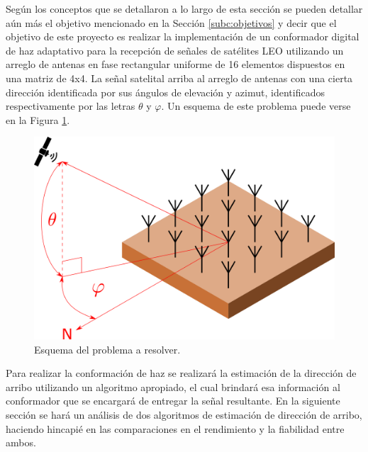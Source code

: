 Según los conceptos que se detallaron a lo largo de esta sección se pueden detallar aún más el objetivo mencionado en la Sección \ref{subc:objetivos} y decir que el objetivo de este proyecto es realizar la implementación de un conformador digital de haz adaptativo para la recepción de señales de satélites LEO utilizando un arreglo de antenas en fase rectangular uniforme de 16 elementos dispuestos en una matriz de 4x4. La señal satelital arriba al arreglo de antenas con una cierta dirección identificada por sus ángulos de elevación y azimut, identificados respectivamente por las letras $\theta$ y $\varphi$. Un esquema de este problema puede verse en la Figura \ref{fig:beamforming_problem}.

\begin{figure}[ht]
    \centering
    \includegraphics[width=1\linewidth]{images/02-Beamforming/problem.png}
    \caption{Esquema del problema a resolver.}
    \label{fig:beamforming_problem}
\end{figure}

Para realizar la conformación de haz se realizará la estimación de la dirección de arribo utilizando un algoritmo apropiado, el cual brindará esa información al conformador que se encargará de entregar la señal resultante. En la siguiente sección se hará un análisis de dos algoritmos de estimación de dirección de arribo, haciendo hincapié en las comparaciones en el rendimiento y la fiabilidad entre ambos.